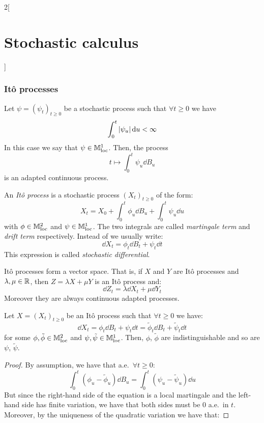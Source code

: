 \documentclass[../../../main_math.tex]{subfiles}
\begin{document}
\begin{multicols}{2}[\section{Stochastic calculus}]
  \subsubsection{Itô processes}
  \begin{proposition}
    Let $\psi={(\psi_t)}_{t\geq 0}$ be a stochastic process such that $\forall t\geq 0$ we have
    $$
      \int_0^t \abs{\psi_u}\dd{u}<\infty
    $$
    In this case we say that $\psi\in \mathbb{M}^1_{\text{loc}}$. Then, the process $$
      t\mapsto \int_0^t \psi_u\dd{B_u}
    $$
    is an adapted continuous process.
  \end{proposition}
  \begin{definition}
    An \emph{Itô process} is a stochastic process ${(X_t)}_{t\geq 0}$ of the form:
    \begin{equation}\label{SC:ito_process}
      X_t=X_0+\int_0^t \phi_u\dd{B_u}+\int_0^t \psi_u\dd{u}
    \end{equation}
    with $\phi\in\mathbb{M}^2_{\text{loc}}$ and $\psi\in\mathbb{M}^1_{\text{loc}}$. The two integrals are called \emph{martingale term} and \emph{drift term} respectively. Instead of  we usually write:
    $$
      \dd{X_t}=\phi_t\dd{B_t}+\psi_t\dd{t}
    $$
    This expression is called \emph{stochastic differential}.
  \end{definition}
  \begin{remark}
    Itô processes form a vector space. That is, if $X$ and $Y$ are Itô processes and $\lambda,\mu\in\mathbb{R}$, then $Z=\lambda X+\mu Y$ is an Itô process and:
    $$
      \dd{Z_t}=\lambda\dd{X_t}+\mu\dd{Y_t}
    $$
    Moreover they are always continuous adapted processes.
  \end{remark}
  \begin{proposition}
    Let $X={(X_t)}_{t\geq 0}$ be an Itô process such that $\forall t\geq 0$ we have:
    $$
      \dd{X_t}=\phi_t\dd{B_t}+\psi_t\dd{t}=\tilde{\phi}_t\dd{B_t}+\tilde{\psi}_t\dd{t}
    $$
    for some $\phi,\tilde{\phi}\in\mathbb{M}^2_{\text{loc}}$ and $\psi,\tilde{\psi}\in\mathbb{M}^1_{\text{loc}}$. Then, $\phi$, $\tilde{\phi}$ are indistinguishable and so are $\psi$, $\tilde{\psi}$.
  \end{proposition}
  \begin{proof}
    By assumption, we have that a.e.\ $\forall t\geq 0$:
    $$
      \int_0^t{( \phi_u-\tilde{\phi}_u)}\dd{B_u}=\int_0^t{(\psi_u-\tilde{\psi}_u)}\dd{u}
    $$
    But since the right-hand side of the equation is a local martingale and the left-hand side has finite variation, we have that both sides must be 0 a.e.\ in $t$. Moreover, by the uniqueness of the quadratic variation we have that:

\end{proof}
\end{multicols}
\end{document}
